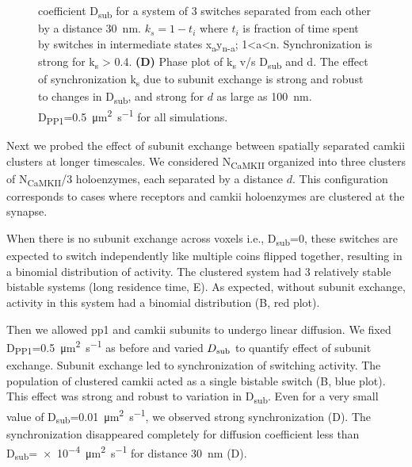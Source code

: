 \documentclass[9pt,lineno,doublespacing]{elife}
\newcommand\SUB[2]{#1\textsubscript{#2}}
\begin{document}
\begin{figure}
{        coefficient \SUB{D}{sub} for a system of 3 switches separated from each
        other by a distance \SI{30}{\nano \meter}.
        $k_s=1-t_i$ where $t_i$ is fraction of time
        spent by switches in intermediate states
        x\textsubscript{a}y\textsubscript{n-a}; 1\textless{}a\textless{}n.
        Synchronization is strong for k\textsubscript{s} \textgreater{} 0.4.
        \textbf{(D)} Phase plot of \SUB{k}{s} v/s \SUB{D}{sub} and d. The effect
        of synchronization \SUB{k}{s} due to subunit exchange is strong and
        robust to changes in \SUB{D}{sub}, and strong for $d$ as large as
        \SI{100}{\nano\meter}. \SUB{D}{PP1}=\SI{0.5}{\micro\meter\squared\per\second}
        for all simulations. 
    }\label{fig:sync_spread}
\end{figure}

Next we probed the effect of subunit exchange between spatially separated
\gls{camkii} clusters at longer timescales. We considered \SUB{N}{CaMKII}
organized into three clusters of \SUB{N}{CaMKII}/3 holoenzymes, each separated
by a distance \(d\). This configuration corresponds to cases where receptors and
\gls{camkii} holoenzymes are clustered at the synapse. 

When there is no subunit exchange across voxels i.e., \SUB{D}{sub}=0, these
switches are expected to switch independently like multiple coins flipped
together, resulting in a binomial distribution of activity. The clustered system
had 3 relatively stable bistable systems (long residence time,
E). As expected, without subunit exchange, activity in
this system had a binomial distribution (B, red plot). 

Then we allowed \gls{pp1} and \gls{camkii} subunits to undergo linear diffusion.
We fixed \SUB{D}{PP1}=\SI{0.5}{\micro\meter\squared\per\second} as before and varied
$\SUB{D}{sub}$ to quantify effect of subunit exchange.  Subunit exchange led to
synchronization of switching activity. The population of clustered \gls{camkii}
acted as a single bistable switch (B, blue plot).
This effect was strong and robust to variation in \SUB{D}{sub}. Even for a very
small value of \SUB{D}{sub}=\SI{0.01}{\micro\meter\squared\per\second}, we observed
strong synchronization (D). The synchronization
disappeared completely for diffusion coefficient less than
\SUB{D}{sub}=\SI{e-4}{\micro\meter\squared\per\second} for distance
\SI{30}{\nano\meter} (D).
\end{document}
